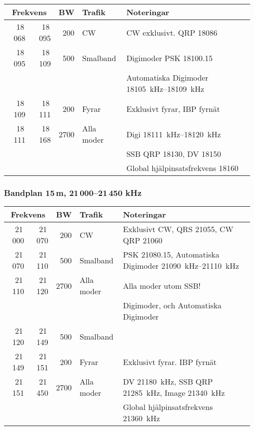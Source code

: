 \begin{tabular}{rrrll}
\multicolumn{2}{c}{\textbf{Frekvens}} & \textbf{BW} & \textbf{Trafik} & \textbf{Noteringar} \\ \hline
 18\,068 & 18\,095 & 200  & CW         & CW exklusivt. QRP \SI{18086}{}                 \\ \hline
18\,095 & 18\,109 & 500  & Smalband   & Digimoder PSK \SI{18100,15}{}                  \\
        &         &      &            & Automatiska Digimoder \SIrange{18105}{18109}{kHz} \\ \hline
18\,109 & 18\,111 & 200  & Fyrar      & Exklusivt fyrar, IBP fyrnät                       \\ \hline
18\,111 & 18\,168 & 2700 & Alla moder & Digi \SIrange{18111}{18120}{kHz}                  \\
        &         &      &            & SSB QRP \SI{18130}{}, DV \SI{18150}{}       \\
        &         &      &            & Global hjälpinsatsfrekvens \SI{18160}{}        \\ \hline
\end{tabular}

\subsubsection{Bandplan 15\,m, 21\,000--21\,450 kHz}

\begin{tabular}{rrrll}
\multicolumn{2}{c}{\textbf{Frekvens}} & \textbf{BW} & \textbf{Trafik} & \textbf{Noteringar} \\ \hline

21\,000 & 21\,070 & 200  & CW         & Exklusivt CW, QRS \SI{21055}{}, CW QRP \SI{21060}{}           \\ \hline
21\,070 & 21\,110 & 500  & Smalband   & PSK \SI{21080,15}{}, Automatiska Digimoder \SIrange{21090}{21110}{kHz} \\
21\,110 & 21\,120 & 2700 & Alla moder & Alla moder utom SSB!                                \\
        &         &      &            & Digimoder, och Automatiska Digimoder                \\ \hline
21\,120 & 21\,149 & 500  & Smalband   &                                                     \\ \hline
21\,149 & 21\,151 & 200  & Fyrar      & Exklusivt fyrar. IBP fyrnät                         \\ \hline
21\,151 & 21\,450 & 2700 & Alla moder & DV \SI{21180}{kHz}, SSB QRP \SI{21285}{kHz}, Image \SI{21340}{kHz}          \\
         &         &      &            & Global hjälpinsatsfrekvens \SI{21360}{kHz}              \\ \hline
\end{tabular}

